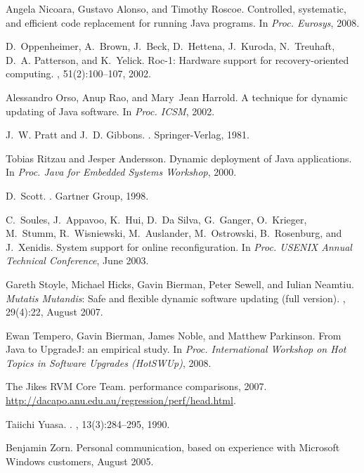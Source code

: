 \documentclass[9pt]{sigplanconf}
\begin{document}
\begin{thebibliography}{10}
Angela Nicoara, Gustavo Alonso, and Timothy Roscoe.
\newblock Controlled, systematic, and efficient code replacement for running
  {Java} programs.
\newblock In {\em Proc. Eurosys}, 2008.

D.~Oppenheimer, A.~Brown, J.~Beck, D.~Hettena, J.~Kuroda, N.~Treuhaft, D.~A.
  Patterson, and K.~Yelick.
\newblock Roc-1: Hardware support for recovery-oriented computing.
, 51(2):100--107, 2002.

Alessandro Orso, Anup Rao, and Mary~Jean Harrold.
\newblock A technique for dynamic updating of {Java} software.
\newblock In {\em Proc. ICSM}, 2002.

J.~W. Pratt and J.~D. Gibbons.
.
\newblock Springer-Verlag, 1981.

Tobias Ritzau and Jesper Andersson.
\newblock Dynamic deployment of {Java} applications.
\newblock In {\em Proc. {Java} for Embedded Systems Workshop}, 2000.

D.~Scott.
.
\newblock Gartner Group, 1998.

C.~Soules, J.~Appavoo, K.~Hui, D.~Da Silva, G.~Ganger, O.~Krieger, M.~Stumm,
  R.~Wisniewski, M.~Auslander, M.~Ostrowski, B.~Rosenburg, and J.~Xenidis.
\newblock System support for online reconfiguration.
\newblock In {\em Proc. USENIX Annual Technical Conference}, June 2003.

Gareth Stoyle, Michael Hicks, Gavin Bierman, Peter Sewell, and Iulian Neamtiu.
\newblock \emph{Mutatis Mutandis}: Safe and flexible dynamic software updating
  (full version).
, 29(4):22, August 2007.

Ewan Tempero, Gavin Bierman, James Noble, and Matthew Parkinson.
\newblock From {Java} to {UpgradeJ}: an empirical study.
\newblock In {\em Proc. International Workshop on Hot Topics in Software
  Upgrades (HotSWUp)}, 2008.

{The Jikes RVM Core Team}.
 performance comparisons, 2007.
\newblock \url{http://dacapo.anu.edu.au/regression/perf/head.html}.

Taiichi Yuasa.
.
, 13(3):284--295, 1990.

Benjamin Zorn.
\newblock Personal communication, based on experience with Microsoft Windows
  customers, August 2005.

\end{thebibliography}
\end{document}
